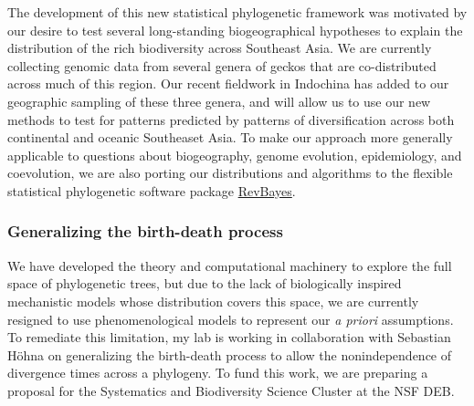 The development of this new statistical phylogenetic framework was motivated by
our desire to test several long-standing biogeographical hypotheses to explain
the distribution of the rich biodiversity across Southeast Asia.
We are currently collecting genomic data from several genera of geckos that are
co-distributed across much of this region.
Our recent fieldwork in Indochina has added to our geographic sampling of these
three genera, and will allow us to use our new methods to test for patterns
predicted by patterns of diversification across both continental and oceanic
Southeaset Asia.
To make our approach more generally applicable to questions about biogeography,
genome evolution, epidemiology, and coevolution,
we are also porting our distributions and algorithms to the flexible
statistical phylogenetic software package
\href{https://revbayes.github.io/}{RevBayes}.

\subsubsection*{Generalizing the birth-death process}
We have developed the theory and computational machinery to explore
the full space of phylogenetic trees, but due to the lack
of biologically inspired mechanistic models whose distribution covers
this space, we are currently resigned to use phenomenological models
to represent our \emph{a priori} assumptions.
To remediate this limitation, my lab is working in collaboration with Sebastian
H{\"o}hna on generalizing the birth-death process to allow the nonindependence
of divergence times across a phylogeny.
To fund this work, we are preparing a proposal for the Systematics and
Biodiversity Science Cluster at the NSF DEB. 

